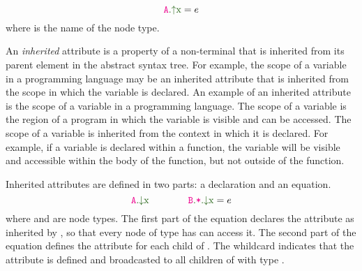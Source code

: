 \begin{equation*}
  \Asyn{A}{x} = e
  \end{equation*}
where  is the name of the node type.

An \emph{inherited} attribute is a property of a non-terminal that is inherited from
its parent element in the abstract syntax tree. For example, the scope of a variable
in a programming language may be an inherited attribute that is inherited from the
scope in which the variable is declared.
An example of an inherited attribute is the scope of a variable in a programming
language. The scope of a variable is the region of a program in which the variable
is visible and can be accessed. The scope of a variable is inherited from the
context in which it is declared. For example, if a variable is declared within a
function, the variable will be visible and accessible within the body of the function,
but not outside of the function.


Inherited attributes are defined in two parts: a declaration and an equation.
\begin{equation*}
\Ainh{A}{x} \quad\quad \quad\quad \Ainhdef{B}{*}{x} = e
\end{equation*}
where  and  are node types.
The first part of the equation declares the attribute  as inherited by ,
so that every node of type  has can access it. The second part of the
equation defines the attribute for each child of . The whildcard \astnode{*}
indicates that the attribute is defined and broadcasted to all children of  with type .

